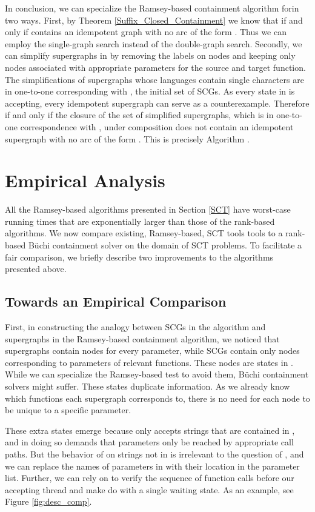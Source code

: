 \documentclass{LMCS}
\newcommand\buchi{B\"uchi }
\begin{document}
In conclusion, we can specialize the Ramsey-based containment algorithm
for\linebreak[1]
  in two ways.  First, by Theorem
\ref{Suffix_Closed_Containment} we know that  if and
only if  contains an idempotent graph
 with no arc of the form . Thus
we can employ the single-graph search instead of the double-graph search.
Secondly, we can simplify supergraphs in  by removing the labels on
nodes and keeping only nodes associated with appropriate parameters for the
source and target function.  The simplifications of supergraphs whose languages
contain single characters are in one-to-one corresponding with , the initial
set of SCGs.  As every state in  is accepting, every idempotent
supergraph can serve as a counterexample. Therefore 
if and only if the closure of the set of simplified supergraphs, which is in
one-to-one correspondence with , under composition does not contain an
idempotent supergraph with no arc of the form . This is precisely
Algorithm \LJB.

\section{Empirical Analysis}\label{Sect:Exps}
All the Ramsey-based algorithms presented in Section \ref{SCT} have worst-case
running times that are exponentially larger than those of the rank-based
algorithms. We now compare existing, Ramsey-based, SCT tools tools to a
rank-based \buchi containment solver on the domain of SCT problems.  To
facilitate a fair comparison, we briefly describe two improvements to the
algorithms presented above.  

\subsection{Towards an Empirical Comparison}\label{Sect:Prep}

First, in constructing the analogy between SCGs in the \LJB algorithm and
supergraphs in the Ramsey-based containment algorithm, we noticed that
supergraphs contain nodes for every parameter, while SCGs contain only
nodes corresponding to parameters of relevant functions.  These nodes are
states in . While we can specialize the Ramsey-based test to avoid
them, \buchi containment solvers might suffer. These states duplicate
information. As we already know which functions each supergraph corresponds to,
there is no need for each node to be unique to a specific parameter.

These extra states emerge because  only accepts strings that are contained
in , and in doing so demands that parameters only be reached by
appropriate call paths.  But the behavior of  on strings not in
 is irrelevant to the question of , and we
can replace the names of parameters in  with their location in the
parameter list.  Further, we can rely on  to verify the sequence of
function calls before our accepting thread and make do with a single waiting
state. As an example, see Figure \ref{fig:desc_comp}.
\end{document}
